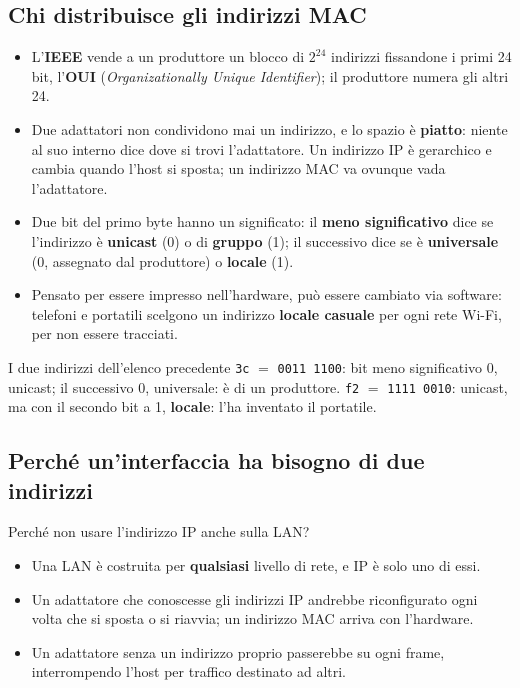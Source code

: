 \subsection{Chi distribuisce gli indirizzi MAC}

\begin{itemize}
    \item L'\textbf{IEEE} vende a un produttore un blocco di $2^{24}$ indirizzi fissandone i primi 24 bit, l'\textbf{OUI}
          (\emph{Organizationally Unique Identifier}); il produttore numera gli altri 24.
    \item Due adattatori non condividono mai un indirizzo, e lo spazio è \textbf{piatto}: niente al suo interno dice dove si trovi
          l'adattatore. Un indirizzo IP è gerarchico e cambia quando l'host si sposta; un indirizzo MAC va ovunque vada l'adattatore.
    \item Due bit del primo byte hanno un significato: il \textbf{meno significativo} dice se l'indirizzo è \textbf{unicast} (0) o di
          \textbf{gruppo} (1); il successivo dice se è \textbf{universale} (0, assegnato dal produttore) o \textbf{locale} (1).
    \item Pensato per essere impresso nell'hardware, può essere cambiato via software: telefoni e portatili scelgono un indirizzo
          \textbf{locale casuale} per ogni rete Wi-Fi, per non essere tracciati.
\end{itemize}

\begin{esempio}{I due indirizzi dell'elenco precedente}
\texttt{3c} $=$ \texttt{0011\,1100}: bit meno significativo 0, unicast; il successivo 0, universale: è di un produttore.
\texttt{f2} $=$ \texttt{1111\,0010}: unicast, ma con il secondo bit a 1, \textbf{locale}: l'ha inventato il portatile.
\end{esempio}

\subsection{Perché un'interfaccia ha bisogno di due indirizzi}

Perché non usare l'indirizzo IP anche sulla LAN?

\begin{itemize}
    \item Una LAN è costruita per \textbf{qualsiasi} livello di rete, e IP è solo uno di essi.
    \item Un adattatore che conoscesse gli indirizzi IP andrebbe riconfigurato ogni volta che si sposta o si riavvia; un indirizzo MAC
          arriva con l'hardware.
    \item Un adattatore senza un indirizzo proprio passerebbe su ogni frame, interrompendo l'host per traffico destinato ad altri.
\end{itemize}

